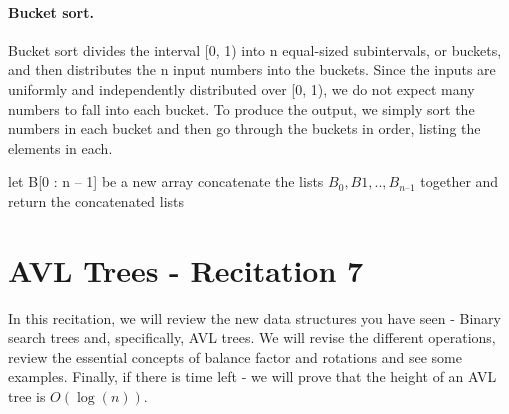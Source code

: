 \paragraph{Bucket sort.}
Bucket sort divides the interval [0, 1) into n equal-sized subintervals, or buckets, and then distributes the n input numbers into the buckets. Since the inputs are uniformly and independently distributed over [0, 1), we do not expect many numbers to fall into each bucket. To produce the output, we simply sort the numbers in each bucket and then go through the buckets in order, listing the elements in each.


  \begin{algorithm}[H]
    	let B[0 : n – 1] be a new array
	\For{ $i \leftarrow [1, n]$}{
	    insert $A_{i}$ into list $B_{ \lfloor n A_{i} \rfloor} ]$
       	}
	concatenate the lists $B_{0}, B{1}, .. , B_{n – 1}$ together and\\
	return the concatenated lists
  \end{algorithm}




\section{AVL Trees  - Recitation 7} 


    In this recitation, we will review the new data structures you have seen - Binary search trees and, specifically, AVL trees. We will revise the different operations, review the essential concepts of balance factor and rotations and see some examples. Finally, if there is time left - we will prove that the height of an AVL tree is $O(\log(n))$.
    
